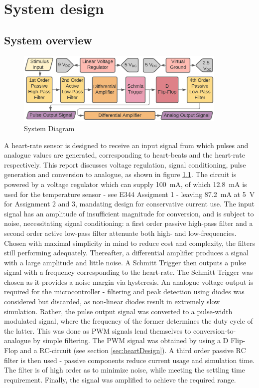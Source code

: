 
\chapter{System design}
\section{System overview} \label{sec:system}

\begin{figure}[h]
    \centering
    \vspace{-0.7cm}
    \includegraphics[width = 0.9\textwidth]{Figures/overview}
    \caption{System Diagram}
    \label{fig:overview}
\end{figure}

A heart-rate sensor is designed to receive an input signal from which pulses and analogue values are generated, corresponding to heart-beats and the heart-rate respectively. This report discusses voltage regulation, signal conditioning, pulse generation and conversion to analogue, as shown in figure \ref{fig:overview}. The circuit is powered by a voltage regulator \cite{prev} which can supply \SI{100}{mA}, of which \SI{12.8}{mA} is used for the temperature sensor - see E344 Assigment 1 \cite{prev} - leaving \SI{87.2}{mA} at \SI{5}{V} for Assignment 2 and 3, mandating design for conservative current use. The input signal has an amplitude of insufficient magnitude for conversion, and is subject to noise, necessitating signal conditioning: a first order passive high-pass filter and a second order active low-pass filter attenuate both high- and low-frequencies. Chosen with maximal simplicity in mind to reduce cost and complexity, the filters still performing adequately. Thereafter, a differential amplifier produces a signal with a large amplitude and little noise. A Schmitt Trigger then outputs a pulse signal with a frequency corresponding to the heart-rate. The Schmitt Trigger was chosen as it provides a noise margin via hysteresis. An analogue voltage output is required for the microcontroller - filtering and peak detection using diodes was considered but discarded, as non-linear diodes result in extremely slow simulation. Rather, the pulse output signal was converted to a pulse-width modulated signal, where the frequency of the former determines the duty cycle of the latter. This was done as PWM signals lend themselves to conversion-to-analogue by simple filtering. The PWM signal was obtained by using a D Flip-Flop and a RC-circuit (see section \ref{sec:heartDesign}). A third order passive RC filter is then used - passive components reduce current usage and simulation time. The filter is of high order as to minimize noise, while meeting the settling time requirement. Finally, the signal was amplified to achieve the required range.